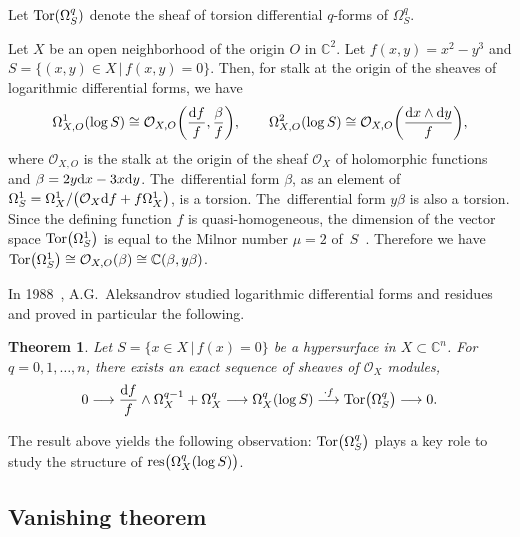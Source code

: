 \documentclass[10pt,a4paper]{amsart}
\numberwithin{equation}{section}
\newtheorem{Theorem}{Theorem}[section]
\begin{document}
Let $ {\rm Tor}(\Omega_S^{q}) $ denote the sheaf of torsion differential $q$-forms of $ \Omega_S^{q}$.

\begin{Example}\label{Ex1}
Let $ X $ be an open neighborhood of the origin $O$ in $ \mathbb{C}^2.$ Let $ f(x,y)=x^2-y^3$ and $ S=\{ (x,y) \in X \,|\, f(x,y)=0 \}$. Then, for stalk at the origin of the sheaves of logarithmic differential forms, we have
\begin{gather*}
\Omega_{X,O}^{1}(\log S) \cong {\mathcal O}_{X,O}\bigg(\frac{{\rm d}f}{f}, \frac{\beta}{f}\bigg), \qquad \Omega_{X,O}^{2}(\log S) \cong {\mathcal O}_{X,O}\bigg(\frac{{\rm d}x\wedge {\rm d}y}{f}\bigg),
\end{gather*}
where ${\mathcal O}_{X,O}$ is the stalk at the origin of the sheaf ${\mathcal O}_X$ of holomorphic functions and $\beta=2y {\rm d}x-3x{\rm d}y$. The~dif\-ferential form $\beta$, as an element of $\Omega_S^{1} = \Omega_X^{1}/\big(\mathcal{O}_{X}{\rm d}f +f\Omega_X^{1}\big)$, is a torsion. The~dif\-ferential form $y\beta$ is also a torsion. Since the defining function $f$ is quasi-homogeneous, the dimension of the vector space ${\rm Tor}\big(\Omega_S^{1}\big)$ is equal to the Milnor number $\mu=2$ of~$S$~\cite{M, Z}. Therefore we have
$ {\rm Tor}\big(\Omega_S^{1}\big) \cong {\mathcal O}_{X,O}(\beta) \cong {\mathbb C}(\beta, y\beta)$.
\end{Example}

In 1988~\cite{A88}, A.G.~Aleksandrov studied logarithmic differential forms and residues and proved in particular the following.

\begin{Theorem}
Let $S=\{ x \in X \,|\, f(x) =0 \} $ be a hypersurface in $X \subset {\mathbb C}^n$. For $ q=0,1,\ldots,n $, there exists an exact sequence of sheaves of $ {\mathcal O}_{X} $ modules,
\begin{gather*}
0 \longrightarrow\frac{{\rm d}f}{f} \wedge \Omega_{X}^{q-1}+ \Omega_{X}^{q} \longrightarrow
\Omega_{X}^{q}(\log S) \stackrel{\cdot f}\longrightarrow {\rm Tor}\big(\Omega_{S}^{q}\big) \longrightarrow 0.
\end{gather*}
\end{Theorem}

The result above yields the following observation:
$ {\rm Tor}\big(\Omega_{S}^{q}\big)$ plays a key role to study the structure of $ {\rm res}\big(\Omega_X^{q}(\log S)\big)$.

\subsection{Vanishing theorem}
\end{document}
